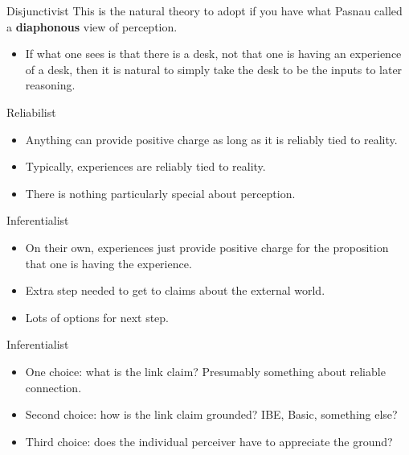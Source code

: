 \documentclass[
  17pt,
  letterpaper,
  ignorenonframetext,
  aspectratio=169,
  handout,
  xcolor={dvipsnames}]{beamer}
\providecommand{\tightlist}{%
  \setlength{\itemsep}{0pt}\setlength{\parskip}{0pt}}\usepackage{longtable,booktabs,array}
\begin{document}
\begin{frame}{Disjunctivist}
\protect\hypertarget{disjunctivist-1}{}
This is the natural theory to adopt if you have what Pasnau called a
\textbf{diaphonous} view of perception.

\begin{itemize}[<+->]
\tightlist
\item
  If what one sees is that there is a desk, not that one is having an
  experience of a desk, then it is natural to simply take the desk to be
  the inputs to later reasoning.
\end{itemize}
\end{frame}

\begin{frame}{Reliabilist}
\protect\hypertarget{reliabilist}{}
\begin{itemize}[<+->]
\tightlist
\item
  Anything can provide positive charge as long as it is reliably tied to
  reality.
\item
  Typically, experiences are reliably tied to reality.
\item
  There is nothing particularly special about perception.
\end{itemize}
\end{frame}

\begin{frame}{Inferentialist}
\protect\hypertarget{inferentialist}{}
\begin{itemize}[<+->]
\tightlist
\item
  On their own, experiences just provide positive charge for the
  proposition that one is having the experience.
\item
  Extra step needed to get to claims about the external world.
\item
  Lots of options for next step.
\end{itemize}
\end{frame}

\begin{frame}{Inferentialist}
\protect\hypertarget{inferentialist-1}{}
\begin{itemize}[<+->]
\tightlist
\item
  One choice: what is the link claim? Presumably something about
  reliable connection.
\item
  Second choice: how is the link claim grounded? IBE, Basic, something
  else?
\item
  Third choice: does the individual perceiver have to appreciate the
  ground?
\end{itemize}
\end{frame}
\end{document}
